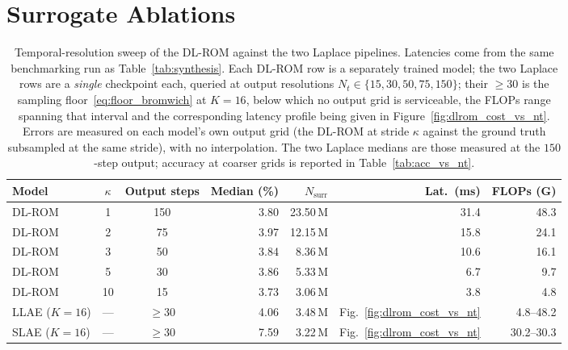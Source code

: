 ﻿\documentclass[a4paper,12pt]{article}
\theoremstyle{definition}
\theoremstyle{remark}
\begin{document}
\clearpage
\section{Surrogate Ablations}
\label{app:surr_ablation}

\begin{table}[htbp]
    \centering
    \small
    \setlength{\tabcolsep}{6pt}
    \renewcommand{\arraystretch}{1.3}
    \begin{tabular}{lccrrrr}
        \toprule
        \textbf{Model} & $\kappa$ & \textbf{Output steps}
            & \textbf{Median (\%)} & $N_{\mathrm{surr}}$ & \textbf{Lat.\ (ms)} & \textbf{FLOPs (G)} \\
        \midrule
        DL-ROM & 1  & 150 & 3.80 & 23.50\,M & 31.4 & 48.3 \\
        DL-ROM & 2  &  75 & 3.97 & 12.15\,M & 15.8 & 24.1 \\
        DL-ROM & 3  &  50 & 3.84 &  8.36\,M & 10.6 & 16.1 \\
        DL-ROM & 5  &  30 & 3.86 &  5.33\,M &  6.7 &  9.7 \\
        DL-ROM & 10 &  15 & 3.73 &  3.06\,M &  3.8 &  4.8 \\
        \midrule
        LLAE ($K=16$) & --- & $\geq 30$ & 4.06 & 3.48\,M & Fig.~\ref{fig:dlrom_cost_vs_nt} & 4.8--48.2 \\
        SLAE ($K=16$) & --- & $\geq 30$ & 7.59 & 3.22\,M & Fig.~\ref{fig:dlrom_cost_vs_nt} & 30.2--30.3 \\
        \bottomrule
    \end{tabular}
    \caption{Temporal-resolution sweep of the DL-ROM against the two Laplace pipelines. Latencies come from the same benchmarking run as Table~\ref{tab:synthesis}. Each DL-ROM row is a separately trained model; the two Laplace rows are a \emph{single} checkpoint each, queried at output resolutions $N_t \in \{15, 30, 50, 75, 150\}$; their $\geq 30$ is the sampling floor~\eqref{eq:floor_bromwich} at $K = 16$, below which no output grid is serviceable, the FLOPs range spanning that interval and the corresponding latency profile being given in Figure~\ref{fig:dlrom_cost_vs_nt}. Errors are measured on each model's own output grid (the DL-ROM at stride $\kappa$ against the ground truth subsampled at the same stride), with no interpolation. The two Laplace medians are those measured at the $150$-step output; accuracy at coarser grids is reported in Table~\ref{tab:acc_vs_nt}.}
    \label{tab:dlrom_sweep}
\end{table}
\end{document}
